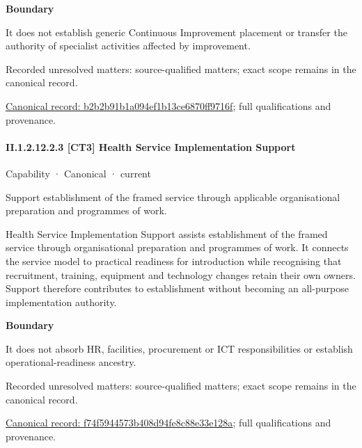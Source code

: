 \textbf{Boundary}



It does not establish generic Continuous Improvement placement or transfer the authority of specialist activities affected by improvement.


{\small Recorded unresolved matters: source-qualified matters; exact scope remains in the canonical record.}\par
{\footnotesize \href{../../../../continuum/strategy/capability/b2b2b91b1a094ef1b13ce6870ff9716f.md}{Canonical record: b2b2b91b1a094ef1b13ce6870ff9716f}; full qualifications and provenance.}\par
\paragraph*{II.1.2.12.2.3 [CT3] Health Service Implementation Support}
\label{navigation:II.1.2.12.2.3}

\label{element:f74f5944573b408d94fe8c88e33e128a}
{\small Capability · Canonical · current}\par

Support establishment of the framed service through applicable organisational preparation and programmes of work.



Health Service Implementation Support assists establishment of the framed service through organisational preparation and programmes of work. It connects the service model to practical readiness for introduction while recognising that recruitment, training, equipment and technology changes retain their own owners. Support therefore contributes to establishment without becoming an all-purpose implementation authority.



\textbf{Boundary}



It does not absorb HR, facilities, procurement or ICT responsibilities or establish operational-readiness ancestry.


{\small Recorded unresolved matters: source-qualified matters; exact scope remains in the canonical record.}\par
{\footnotesize \href{../../../../continuum/strategy/capability/f74f5944573b408d94fe8c88e33e128a.md}{Canonical record: f74f5944573b408d94fe8c88e33e128a}; full qualifications and provenance.}\par
